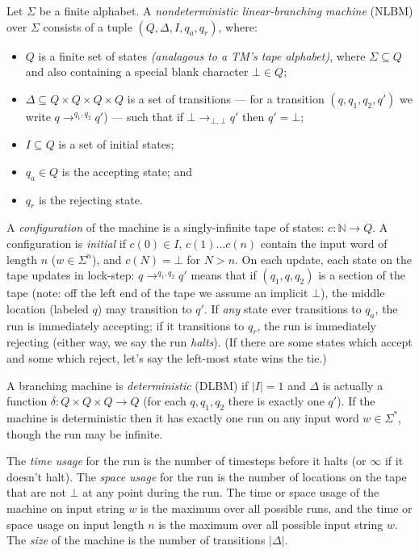 \documentclass{article}
\theoremstyle{definition}
\begin{document}
Let $\Sigma$ be a finite alphabet.
A \emph{nondeterministic linear-branching machine} (NLBM)
over $\Sigma$ consists of a tuple $(Q, \Delta, I, q_a, q_r)$, where:
\begin{itemize}
\item $Q$ is a finite set of states \emph{(analagous to a TM's tape alphabet)}, where $\Sigma \subseteq Q$ and also containing a special blank character $\bot \in Q$;
\item $\Delta \subseteq Q \times Q \times Q \times Q$
is a set of transitions ---
for a transition $(q, q_1, q_2, q')$ we write
$q \to^{q_1, q_2} q'$) ---
such that if $\bot \to_{\bot, \bot} q'$ then $q' = \bot$;
\item $I \subseteq Q$ is a set of initial states;
\item $q_a \in Q$ is the accepting state; and
\item $q_r$ is the rejecting state.
\end{itemize}

A \emph{configuration} of the machine is a singly-infinite tape of states:
$c: \mathbb{N} \to Q$.
A configuration is \emph{initial} if $c(0) \in I$,
$c(1) \ldots c(n)$ contain the input word of length $n$ ($w \in \Sigma^n$),
and $c(N) = \bot$ for $N > n$.
On each update, each state on the tape updates in lock-step:
$q \to^{q_1, q_2} q'$ means that if $(q_1, q, q_2)$ is a section
of the tape (note: off the left end of the tape we assume an implicit $\bot$),
the middle location (labeled $q$) may transition to $q'$.
If \emph{any} state ever transitions to $q_a$, the run is immediately accepting; if it transitions to $q_r$, the run is immediately rejecting (either way, we say the run \emph{halts}).
(If there are some states which accept and some which reject, let's say the left-most state wins the tie.)

A branching machine is \emph{deterministic} (DLBM) if $|I| = 1$ and $\Delta$ is actually a function $\delta: Q \times Q \times Q \to Q$ (for each $q, q_1, q_2$ there is exactly one $q'$).
If the machine is deterministic then it has exactly one run on any input word $w \in \Sigma^*$, though the run may be infinite.

The \emph{time usage} for the run is the number of timesteps before it halts (or $\infty$ if it doesn't halt).
The \emph{space usage} for the run is the number of locations on the tape that are not $\bot$ at any point during the run.
The time or space usage of the machine on input string $w$ is the maximum
over all possible runs, and the time or space usage on input length $n$ is the maximum over all possible input string $w$.
The \emph{size} of the machine is the number of transitions $|\Delta|$.
\end{document}

